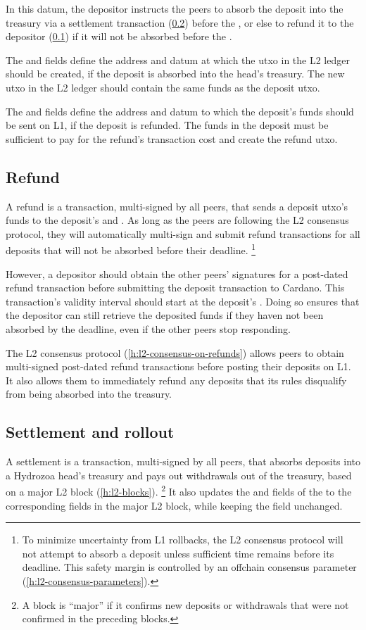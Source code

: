 \documentclass[../hydrozoa.tex]{subfiles}
\begin{document}
In this datum, the depositor instructs the peers to absorb the deposit into the treasury via a settlement transaction (\cref{h:multisig-settle}) before the , or else to refund it to the depositor (\cref{h:multisig-refund}) if it will not be absorbed before the .

The  and  fields define the address and datum at which the utxo in the L2 ledger should be created, if the deposit is absorbed into the head's treasury.
The new utxo in the L2 ledger should contain the same funds as the deposit utxo.

The  and  fields define the address and datum to which the deposit's funds should be sent on L1, if the deposit is refunded.
The funds in the deposit must be sufficient to pay for the refund's transaction cost and create the refund utxo.

\subsection{Refund}%
\label{h:multisig-refund}
A refund is a transaction, multi-signed by all peers, that sends a deposit utxo's funds to the deposit's  and .
As long as the peers are following the L2 consensus protocol, they will automatically multi-sign and submit refund transactions for all deposits that will not be absorbed before their deadline.%
\footnote{To minimize uncertainty from L1 rollbacks, the L2 consensus protocol will not attempt to absorb a deposit unless sufficient time remains before its deadline. This safety margin is controlled by an offchain consensus parameter (\cref{h:l2-consensus-parameters}).}

However, a depositor should obtain the other peers' signatures for a post-dated refund transaction before submitting the deposit transaction to Cardano.
This transaction's validity interval should start at the deposit's .
Doing so ensures that the depositor can still retrieve the deposited funds if they haven not been absorbed by the deadline, even if the other peers stop responding.

The L2 consensus protocol (\cref{h:l2-consensus-on-refunds}) allows peers to obtain multi-signed post-dated refund transactions before posting their deposits on L1.
It also allows them to immediately refund any deposits that its rules disqualify from being absorbed into the treasury.

\subsection{Settlement and rollout}%
\label{h:multisig-settle}
A settlement is a transaction, multi-signed by all peers, that absorbs deposits into a Hydrozoa head's treasury and pays out withdrawals out of the treasury, based on a major L2 block (\cref{h:l2-blocks}).%
\footnote{A block is ``major'' if it confirms new deposits or withdrawals that were not confirmed in the preceding blocks.}
It also updates the  and  fields of the  to the corresponding fields in the major L2 block, while keeping the  field unchanged.
\end{document}
